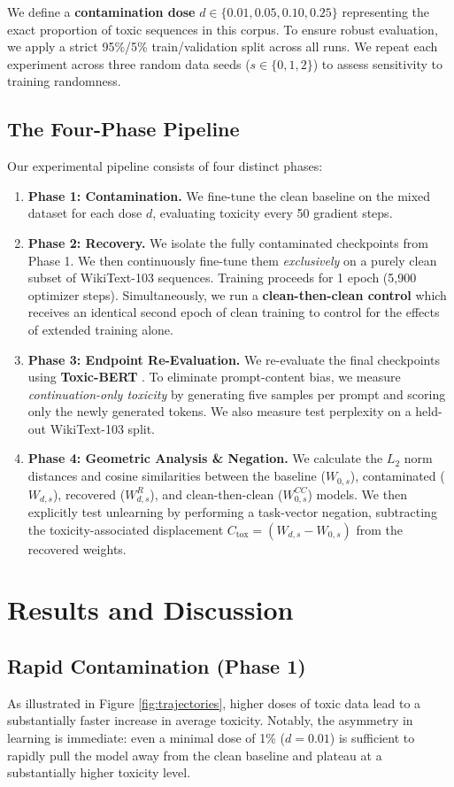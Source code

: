 \documentclass[11pt,a4paper]{article}
\begin{document}
We define a \textbf{contamination dose} $d \in \{0.01, 0.05, 0.10, 0.25\}$ representing the exact proportion of toxic sequences in this corpus. To ensure robust evaluation, we apply a strict 95\%/5\% train/validation split across all runs. We repeat each experiment across three random data seeds ($s \in \{0, 1, 2\}$) to assess sensitivity to training randomness.

\subsection{The Four-Phase Pipeline}
Our experimental pipeline consists of four distinct phases:
\begin{enumerate}
    \item \textbf{Phase 1: Contamination.} We fine-tune the clean baseline on the mixed dataset for each dose $d$, evaluating toxicity every 50 gradient steps.
    \item \textbf{Phase 2: Recovery.} We isolate the fully contaminated checkpoints from Phase 1. We then continuously fine-tune them \textit{exclusively} on a purely clean subset of WikiText-103 sequences. Training proceeds for 1 epoch (5,900 optimizer steps). Simultaneously, we run a \textbf{clean-then-clean control} which receives an identical second epoch of clean training to control for the effects of extended training alone.
    \item \textbf{Phase 3: Endpoint Re-Evaluation.} We re-evaluate the final checkpoints using \textbf{Toxic-BERT} \citep{hanu2020detoxify}. To eliminate prompt-content bias, we measure \textit{continuation-only toxicity} by generating five samples per prompt and scoring only the newly generated tokens. We also measure test perplexity on a held-out WikiText-103 split.
    \item \textbf{Phase 4: Geometric Analysis \& Negation.} We calculate the $L_2$ norm distances and cosine similarities between the baseline ($W_{0,s}$), contaminated ($W_{d,s}$), recovered ($W^{R}_{d,s}$), and clean-then-clean ($W^{CC}_{0,s}$) models. We then explicitly test unlearning by performing a task-vector negation, subtracting the toxicity-associated displacement $C_{\mathrm{tox}} = (W_{d,s}-W_{0,s})$ from the recovered weights.
\end{enumerate}

\section{Results and Discussion}
\subsection{Rapid Contamination (Phase 1)}
As illustrated in Figure \ref{fig:trajectories}, higher doses of toxic data lead to a substantially faster increase in average toxicity. Notably, the asymmetry in learning is immediate: even a minimal dose of 1\% ($d=0.01$) is sufficient to rapidly pull the model away from the clean baseline and plateau at a substantially higher toxicity level. 
\end{document}

